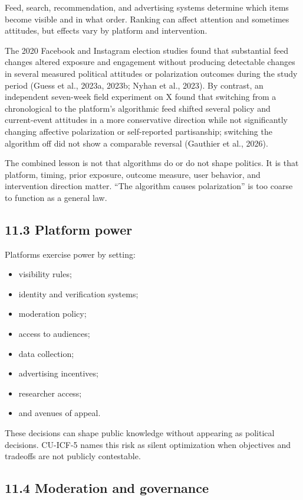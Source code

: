 \documentclass[
  11pt,
]{article}
\providecommand{\tightlist}{%
  \setlength{\itemsep}{0pt}\setlength{\parskip}{0pt}}
\begin{document}
Feed, search, recommendation, and advertising systems determine which
items become visible and in what order. Ranking can affect attention and
sometimes attitudes, but effects vary by platform and intervention.

The 2020 Facebook and Instagram election studies found that substantial
feed changes altered exposure and engagement without producing
detectable changes in several measured political attitudes or
polarization outcomes during the study period (Guess et al., 2023a,
2023b; Nyhan et al., 2023). By contrast, an independent seven-week field
experiment on X found that switching from a chronological to the
platform's algorithmic feed shifted several policy and current-event
attitudes in a more conservative direction while not significantly
changing affective polarization or self-reported partisanship; switching
the algorithm off did not show a comparable reversal (Gauthier et al.,
2026).

The combined lesson is not that algorithms do or do not shape politics.
It is that platform, timing, prior exposure, outcome measure, user
behavior, and intervention direction matter. ``The algorithm causes
polarization'' is too coarse to function as a general law.

\subsection{11.3 Platform power}\label{platform-power}

Platforms exercise power by setting:

\begin{itemize}
\tightlist
\item
  visibility rules;
\item
  identity and verification systems;
\item
  moderation policy;
\item
  access to audiences;
\item
  data collection;
\item
  advertising incentives;
\item
  researcher access;
\item
  and avenues of appeal.
\end{itemize}

These decisions can shape public knowledge without appearing as
political decisions. CU-ICF-5 names this risk as silent optimization
when objectives and tradeoffs are not publicly contestable.

\subsection{11.4 Moderation and
governance}\label{moderation-and-governance}
\end{document}
